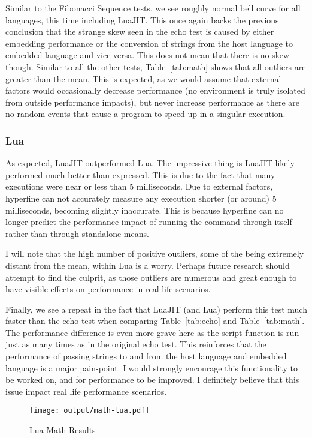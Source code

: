 Similar to the Fibonacci Sequence tests, we see roughly normal bell curve for all languages, this time including LuaJIT. This once again backs the previous conclusion that the strange skew seen in the echo test is caused by either embedding performance or the conversion of strings from the host language to embedded language and vice versa. This does not mean that there is no skew though. Similar to all the other tests, Table~\ref{tab:math} shows that all outliers are greater than the mean. This is expected, as we would assume that external factors would occasionally decrease performance (no environment is truly isolated from outside performance impacts), but never increase performance as there are no random events that cause a program to speed up in a singular execution.

\subsubsection{Lua}
As expected, LuaJIT outperformed Lua. The impressive thing is LuaJIT likely performed much better than expressed. This is due to the fact that many executions were near or less than 5 milliseconds. Due to external factors, hyperfine can not accurately measure any execution shorter (or around) 5 milliseconds, becoming slightly inaccurate. This is because hyperfine can no longer predict the performance impact of running the command through itself rather than through standalone means.

I will note that the high number of positive outliers, some of the being extremely distant from the mean, within Lua is a worry. Perhaps future research should attempt to find the culprit, as those outliers are numerous and great enough to have visible effects on performance in real life scenarios.

Finally, we see a repeat in the fact that LuaJIT (and Lua) perform this test much faster than the echo test when comparing Table~\ref{tab:echo} and Table~\ref{tab:math}. The performance difference is even more grave here as the script function is run just as many times as in the original echo test. This reinforces that the performance of passing strings to and from the host language and embedded language is a major pain-point. I would strongly encourage this functionality to be worked on, and for performance to be improved. I definitely believe that this issue impact real life performance scenarios.

\begin{figure}[H]
	\centering
		\texttt{[image: output/math-lua.pdf]}
	\caption{Lua Math Results}
	\label{fig:math-lua}
\end{figure}

